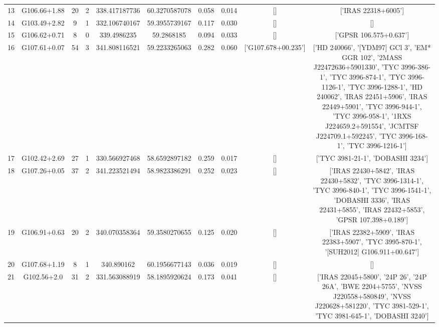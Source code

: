 \begin{table}
\begin{tabular}{cccccccccc}
13 & G106.66+1.88 & 20 & 2 & 338.417187736 & 60.3270587078 & 0.058 & 0.014 & [] & ['IRAS 22318+6005'] \\
14 & G103.49+2.82 & 9 & 1 & 332.106740167 & 59.3955739167 & 0.117 & 0.030 & [] & [] \\
15 & G106.62+0.71 & 8 & 0 & 339.4986235 & 59.2868185 & 0.094 & 0.033 & [] & ['GPSR 106.575+0.637'] \\
16 & G107.61+0.07 & 54 & 3 & 341.808116521 & 59.2233265063 & 0.282 & 0.060 & ['G107.678+00.235'] & ['HD 240066', '[YDM97] GCl  3', 'EM* GGR  102', '2MASS J22472636+5901330', 'TYC 3996-386-1', 'TYC 3996-874-1', 'TYC 3996-1126-1', 'TYC 3996-1288-1', 'HD 240062', 'IRAS 22451+5906', 'IRAS 22449+5901', 'TYC 3996-944-1', 'TYC 3996-958-1', '1RXS J224659.2+591554', 'JCMTSF J224709.1+592245', 'TYC 3996-168-1', 'TYC 3996-1216-1'] \\
17 & G102.42+2.69 & 27 & 1 & 330.566927468 & 58.6592897182 & 0.259 & 0.017 & [] & ['TYC 3981-21-1', 'DOBASHI 3234'] \\
18 & G107.26+0.05 & 37 & 2 & 341.223521494 & 58.9823386291 & 0.252 & 0.023 & [] & ['IRAS 22430+5842', 'IRAS 22430+5832', 'TYC 3996-1314-1', 'TYC 3996-840-1', 'TYC 3996-1541-1', 'DOBASHI 3336', 'IRAS 22431+5855', 'IRAS 22432+5853', 'GPSR 107.398+0.189'] \\
19 & G106.91+0.63 & 20 & 2 & 340.070358364 & 59.3580270655 & 0.125 & 0.020 & [] & ['IRAS 22382+5909', 'IRAS 22383+5907', 'TYC 3995-870-1', '[SUH2012] G106.911+00.647'] \\
20 & G107.68+1.19 & 8 & 1 & 340.890162 & 60.1956677143 & 0.036 & 0.019 & [] & [] \\
21 & G102.56+2.0 & 31 & 2 & 331.563088919 & 58.1895920624 & 0.173 & 0.041 & [] & ['IRAS 22045+5800', '24P  26', '24P  26A', 'BWE 2204+5755', 'NVSS J220558+580849', 'NVSS J220628+581220', 'TYC 3981-529-1', 'TYC 3981-645-1', 'DOBASHI 3240'] \\

\end{tabular}
\end{table}
